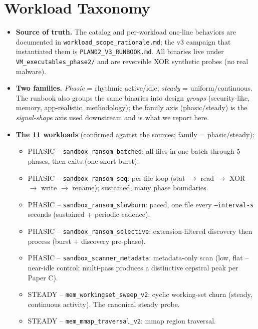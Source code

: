 \documentclass[conference]{IEEEtran}
\begin{document}
\section{Workload Taxonomy}
\label{sec:taxonomy}
\begin{itemize}
  \item \textbf{Source of truth.} The catalog and per-workload one-line
        behaviors are documented in \texttt{workload\_scope\_rationale.md}; the
        v3 campaign that instantiated them is \texttt{PLAN02\_V3\_RUNBOOK.md}.
        All binaries live under \texttt{VM\_executables\_phase2/} and are
        reversible XOR synthetic probes (no real malware).
  \item \textbf{Two families.} \emph{Phasic} = rhythmic active/idle;
        \emph{steady} = uniform/continuous. The runbook also groups the same
        binaries into design \emph{groups} (security-like, memory,
        app-realistic, methodology); the family axis (phasic/steady) is the
        \emph{signal-shape} axis used downstream and is what we report here.
  \item \textbf{The 11 workloads} (confirmed against the sources; family =
        phasic/steady):
    \begin{itemize}
      \item PHASIC -- \texttt{sandbox\_ransom\_batched}: all files in one batch
            through 5 phases, then exits (one short burst). %
      \item PHASIC -- \texttt{sandbox\_ransom\_seq}: per-file loop
            (stat $\to$ read $\to$ XOR $\to$ write $\to$ rename); sustained,
            many phase boundaries.
      \item PHASIC -- \texttt{sandbox\_ransom\_slowburn}: paced, one file every
            \texttt{--interval-s} seconds (sustained + periodic cadence).
      \item PHASIC -- \texttt{sandbox\_ransom\_selective}: extension-filtered
            discovery then process (burst + discovery pre-phase).
      \item PHASIC -- \texttt{sandbox\_scanner\_metadata}: metadata-only scan
            (low, flat -- near-idle control; multi-pass produces a distinctive
            cepstral peak per Paper C).
      \item STEADY -- \texttt{mem\_workingset\_sweep\_v2}: cyclic working-set
            churn (steady, continuous activity). The canonical steady probe.
      \item STEADY -- \texttt{mem\_mmap\_traversal\_v2}: mmap region traversal.

\end{itemize}
\end{itemize}
\end{document}
